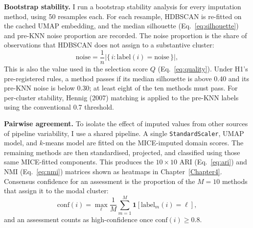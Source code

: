 \noindent \textbf{Bootstrap stability.} I run a bootstrap stability analysis for every imputation method, using 50 resamples each. For each resample, HDBSCAN is re-fitted on the cached UMAP embedding, and the median silhouette (Eq.~\ref{eq:silhouette}) and pre-KNN noise proportion are recorded. The noise proportion is the share of observations that HDBSCAN does not assign to a substantive cluster:
\begin{equation}\label{eq:noise}
\text{noise}=\frac{1}{n}\bigl|\{\,i:\text{label}(i)=\text{noise}\,\}\bigr|,
\end{equation}
This is also the value used in the selection score $Q$ (Eq.~\ref{eq:quality}). Under H1's pre-registered rules, a method passes if its median silhouette is above 0.40 and its pre-KNN noise is below 0.30; at least eight of the ten methods must pass. For per-cluster stability, Hennig (2007) matching is applied to the pre-KNN labels using the conventional 0.7 threshold.

\noindent \textbf{Pairwise agreement.} To isolate the effect of imputed values from other sources of pipeline variability, I use a shared pipeline. A single \texttt{StandardScaler}, UMAP model, and $k$-means model are fitted on the MICE-imputed domain scores. The remaining methods are then standardised, projected, and classified using those same MICE-fitted components. This produces the $10 \times 10$ ARI (Eq.~\ref{eq:ari}) and NMI (Eq.~\ref{eq:nmi}) matrices shown as heatmaps in Chapter~\ref{Chapter4}. Consensus confidence for an assessment is the proportion of the $M=10$ methods that assign it to the modal cluster:
\begin{equation}\label{eq:consensus}
\mathrm{conf}(i)=\max_{\ell}\frac{1}{M}\sum_{m=1}^{M}\mathbf{1}\!\left[\text{label}_m(i)=\ell\right],
\end{equation}
and an assessment counts as high-confidence once $\mathrm{conf}(i)\ge 0.8$.

